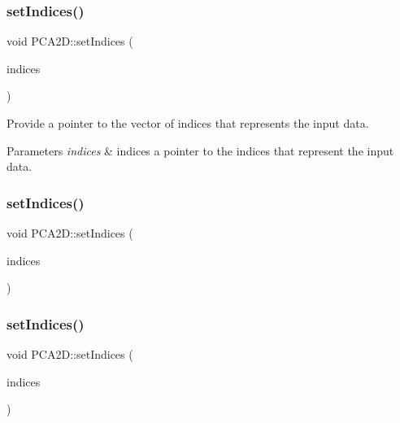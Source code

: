 \subsubsection{\texorpdfstring{set\+Indices()}{setIndices()}\hspace{0.1cm}{\footnotesize\ttfamily [4/10]}}
{\footnotesize\ttfamily void P\+C\+A2\+D\+::set\+Indices (\begin{DoxyParamCaption}\item[{const boost\+::shared\+\_\+ptr$<$ std\+::vector$<$ int $>$$>$ \&}]{indices }\end{DoxyParamCaption})}



Provide a pointer to the vector of indices that represents the input data. 


\begin{DoxyParams}{Parameters}
{\em indices} & indices a pointer to the indices that represent the input data. \\
\hline
\end{DoxyParams}
\mbox{\label{classPCA2D_af6c41fea17b2a9debbef5c88dc963f1e}} 
\subsubsection{\texorpdfstring{set\+Indices()}{setIndices()}\hspace{0.1cm}{\footnotesize\ttfamily [5/10]}}
{\footnotesize\ttfamily void P\+C\+A2\+D\+::set\+Indices (\begin{DoxyParamCaption}\item[{const pcl\+::\+Point\+Indices \&}]{indices }\end{DoxyParamCaption})\hspace{0.3cm}{\ttfamily [inline]}}

\mbox{\label{classPCA2D_aa5b9ccb12b5ce673ac851a2a5c4f4f97}} 
\subsubsection{\texorpdfstring{set\+Indices()}{setIndices()}\hspace{0.1cm}{\footnotesize\ttfamily [6/10]}}
{\footnotesize\ttfamily void P\+C\+A2\+D\+::set\+Indices (\begin{DoxyParamCaption}\item[{const std\+::vector$<$ int $>$ \&}]{indices }\end{DoxyParamCaption})}



